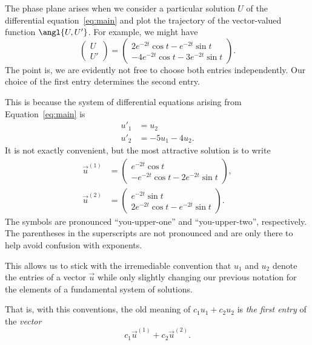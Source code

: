 \documentclass[12pt,twoside]{article}
\begin{document}
The phase plane arises when we consider a particular solution $U$ of the 
differential equation~\eqref{eq:main} and plot the trajectory of the
vector-valued function $\angl{U,U'}$. For example, we might have
\begin{equation*}
    \begin{pmatrix}
        U \\ U'
    \end{pmatrix} = \begin{pmatrix}
        2e^{-2t} \cos{t} - e^{-2t} \sin{t} \\
        -4 e^{-2t} \cos{t} - 3e^{-2t} \sin{t}
    \end{pmatrix}.
\end{equation*}
The point is, we are evidently not free to choose both entries independently.
Our choice of the first entry determines the second entry.

This is because the system of differential equations arising from Equation~\eqref{eq:main} is
\begin{align*}
    u'_1 &= u_2 \\ 
    u'_2 &= -5u_1 - 4u_2.
\end{align*}
It is not exactly convenient, but the most attractive solution is to write
\begin{align*}
    \vec{u}^{(1)} &= \begin{pmatrix}
        e^{-2t} \cos{t} \\ -e^{-2t} \cos{t} - 2e^{-2t} \sin{t}
    \end{pmatrix}, \\[2ex]
    \vec{u}^{(2)}&= \begin{pmatrix}
        e^{-2t} \sin{t} \\ 2 e^{-2t} \cos{t} - e^{-2t} \sin{t}
    \end{pmatrix}.
\end{align*}
The symbols are pronounced ``you-upper-one'' and ``you-upper-two'', respectively.
The parentheses in the superscripts are not pronounced and are only there to
help avoid confusion with exponents.

This allows us to stick with the irremediable convention that $u_1$ and $u_2$
denote the entries of a vector $\vec{u}$ while only slightly changing our
previous notation for the elements of a fundamental system of solutions.

That is, with this conventions, the old meaning of $c_1 u_1 + c_2 u_2$ is
\emph{the first entry} of the \emph{vector}
\begin{equation*}
    c_1 \vec{u}^{(1)} + c_2 \vec{u}^{(2)}.
\end{equation*}
\end{document}
